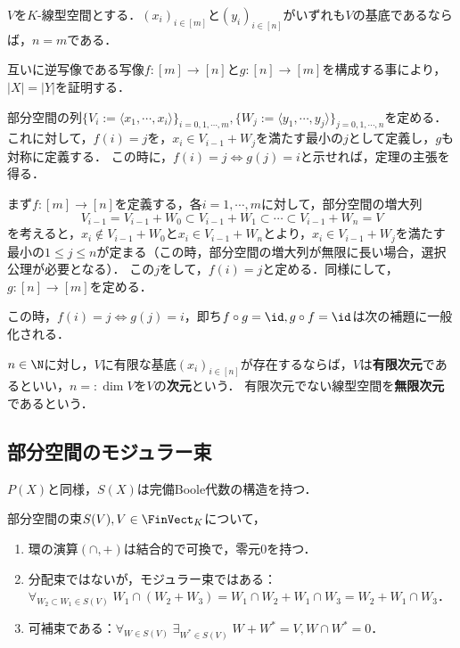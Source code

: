 \documentclass[uplatex, dvipdfmx]{jsreport}
\begin{document}
\begin{theorem}\label{thm-dimention}
    $V$を$K$-線型空間とする．$(x_i)_{i\in [m]}$と$(y_i)_{i\in [n]}$がいずれも$V$の基底であるならば，$n=m$である．
\end{theorem}
\begin{Proof}
    互いに逆写像である写像$f:[m]\to[n]$と$g:[n]\to[m]$を構成する事により，$|X|=|Y|$を証明する．

    部分空間の列$\{V_i:=\langle x_1,\cdots,x_i\rangle\}_{i=0,1,\cdots,m},\{W_j:=\langle y_1,\cdots,y_j\rangle\}_{j=0,1,\cdots,n}$を定める．
    これに対して，$f(i)=j$を，$x_i\in V_{i-1}+W_j$を満たす最小の$j$として定義し，$g$も対称に定義する．
    この時に，$f(i)=j\Leftrightarrow g(j)=i$と示せれば，定理の主張を得る．

    まず$f:[m]\to[n]$を定義する，各$i=1,\cdots,m$に対して，部分空間の増大列
    \[ V_{i-1}=V_{i-1}+W_0\subset V_{i-1}+W_1\subset\cdots\subset V_{i-1}+W_n=V \]
    を考えると，$x_i\notin V_{i-1}+W_0$と$x_i\in V_{i-1}+W_n$とより，$x_i\in V_{i-1}+W_j$を満たす最小の$1\le j\le n$が定まる（この時，部分空間の増大列が無限に長い場合，選択公理が必要となる）．
    この$j$をして，$f(i)=j$と定める．同様にして，$g:[n]\to[m]$を定める．

    この時，$f(i)=j\Leftrightarrow g(j)=i$，即ち$f\circ g=\id,g\circ f=\id$は次の補題に一般化される．
\end{Proof}

\begin{definition}\label{def-dimention}
    $n\in\N$に対し，$V$に有限な基底$(x_i)_{i\in[n]}$が存在するならば，$V$は\textbf{有限次元}であるといい，$n=:\dim V$を$V$の\textbf{次元}という．
    有限次元でない線型空間を\textbf{無限次元}であるという．
\end{definition}

\subsection{部分空間のモジュラー束}

\begin{tcolorbox}[colframe=ForestGreen, colback=ForestGreen!10!white,breakable,colbacktitle=ForestGreen!40!white,coltitle=black,fonttitle=\bfseries\sffamily,
title=]
    $P(X)$と同様，$S(X)$は完備Boole代数の構造を持つ．
\end{tcolorbox}

\begin{proposition}
    部分空間の束$S(V),V\in\FinVect_K$について，
    \begin{enumerate}
        \item 環の演算$(\cap,+)$は結合的で可換で，零元$0$を持つ．
        \item 分配束ではないが，モジュラー束ではある：$\forall_{W_2\subset W_1\in S(V)}\;W_1\cap(W_2+W_3)=W_1\cap W_2+W_1\cap W_3=W_2+W_1\cap W_3$．
        \item 可補束である：$\forall_{W\in S(V)}\;\exists_{W^*\in S(V)}\;W+W^*=V,W\cap W^*=0$．
    \end{enumerate}
\end{proposition}
\end{document}
